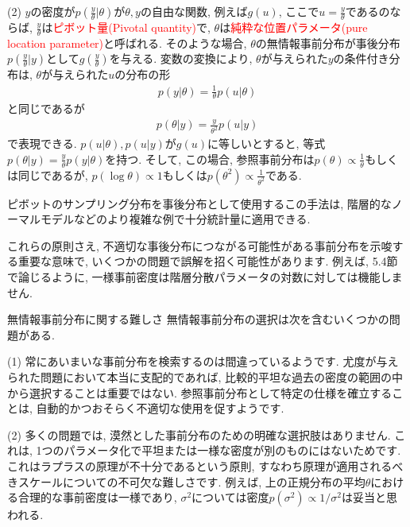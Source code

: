 \documentclass[10pt,dvipdfmx,a4]{beamer}
\newcommand{\eqn}[1]{\begin{align*}#1\end{align*}}
\newcommand{\tcr}[1]{\textcolor{red}{#1}}
\begin{document}
\begin{frame}
(2) $y$の密度が$p(\tfrac{y}{\theta}|\theta)$が$\theta, y$の自由な関数, 例えば$g(u)$, ここで$u=\tfrac{y}{\theta}$であるのならば, $\tfrac{y}{\theta}$は\tcr{ピボット量(Pivotal quantity)}で, $\theta$は\tcr{純粋な位置パラメータ(pure location parameter)}と呼ばれる.
そのような場合, $\theta$の無情報事前分布が事後分布$p(\tfrac{y}{\theta}|y)$として$g(\tfrac{y}{\theta})$を与える.
変数の変換により, $\theta$が与えられた$y$の条件付き分布は, $\theta$が与えられた$u$の分布の形
\eqn{p(y|\theta)=\frac{1}{\theta}p(u|\theta)}
と同じであるが
\eqn{p(\theta|y)=\frac{y}{\theta^2}p(u|y)}
で表現できる.
$p(u|\theta), p(u|y)$が$g(u)$に等しいとすると, 等式$p(\theta|y)=\tfrac{y}{\theta}p(y|\theta)$を持つ.
そして, この場合, 参照事前分布は$p(\theta)\propto\tfrac{1}{\theta}$もしくは同じであるが, $p(\log \theta)\propto 1$もしくは$p(\theta^2)\propto\tfrac{1}{\theta^2}$である.

ピボットのサンプリング分布を事後分布として使用するこの手法は, 階層的なノーマルモデルなどのより複雑な例で十分統計量に適用できる.

これらの原則さえ, 不適切な事後分布につながる可能性がある事前分布を示唆する重要な意味で, いくつかの問題で誤解を招く可能性があります.
例えば, 5.4節で論じるように, 一様事前密度は階層分散パラメータの対数に対しては機能しません.
\end{frame}


\begin{frame}{無情報事前分布に関する難しさ}
無情報事前分布の選択は次を含むいくつかの問題がある.

(1) 常にあいまいな事前分布を検索するのは間違っているようです.
尤度が与えられた問題において本当に支配的であれば, 比較的平坦な過去の密度の範囲の中から選択することは重要ではない.
参照事前分布として特定の仕様を確立することは, 自動的かつおそらく不適切な使用を促すようです.

(2) 多くの問題では, 漠然とした事前分布のための明確な選択肢はありません.
これは, 1つのパラメータ化で平坦または一様な密度が別のものにはないためです.
これはラプラスの原理が不十分であるという原則, すなわち原理が適用されるべきスケールについての不可欠な難しさです.
例えば, 上の正規分布の平均$\theta$における合理的な事前密度は一様であり, $\sigma^2$については密度$p(\sigma^2)\propto1/\sigma^2$は妥当と思われる.
\end{frame}

\end{document}
